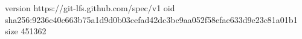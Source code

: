version https://git-lfs.github.com/spec/v1
oid sha256:9236c40c663b75a1d9d0b03cefad42dc3bc9aa052f58efae633d9e23c81a01b1
size 451362
